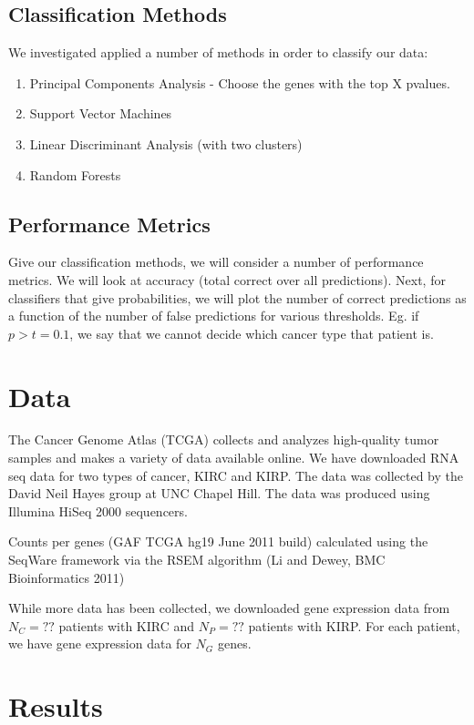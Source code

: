 \subsection{Classification Methods}
We investigated applied a number of methods in order to classify our data:

\begin{enumerate}
\item Principal Components Analysis - Choose the genes with the top X pvalues. 
\item Support Vector Machines
\item Linear Discriminant Analysis (with two clusters)
\item Random Forests
\end{enumerate}


\subsection{Performance Metrics}

Give our classification methods, we will consider a number of performance metrics. We will look at accuracy (total correct over all predictions). Next, for classifiers that give probabilities, we will plot the number of correct predictions as a function of the number of false predictions for various thresholds. Eg. if $p>t=0.1$, we say that we cannot decide which cancer type that patient is. 

\section{Data}
The Cancer Genome Atlas (TCGA) collects and analyzes high-quality tumor samples and makes a variety of data available online. We have downloaded RNA seq data for two types of cancer, KIRC and KIRP. The data was collected by the David Neil Hayes group at UNC Chapel Hill. The data was produced using Illumina HiSeq 2000 sequencers. 

Counts per genes (GAF TCGA hg19 June 2011 build) calculated using the SeqWare framework via the RSEM algorithm (Li and Dewey, BMC Bioinformatics 2011)

While more data has been collected, we downloaded gene expression data from $N_C =??$ patients with KIRC and $N_P = ??$ patients with KIRP.  For each patient, we have gene expression data for $N_G$ genes. 

\section{Results}

